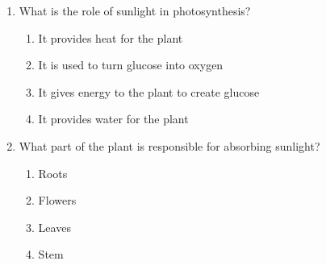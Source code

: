 \documentclass[12pt]{article}
\begin{document}
\begin{enumerate}
    \vspace{0.5cm}

    \item What is the role of sunlight in photosynthesis?

    \begin{enumerate}[label=\Alph*.]
        \item It provides heat for the plant
        \item It is used to turn glucose into oxygen
        \item It gives energy to the plant to create glucose
        \item It provides water for the plant
    \end{enumerate}
    
    \vspace{0.5cm}

    \item What part of the plant is responsible for absorbing sunlight?

    \begin{enumerate}[label=\Alph*.]
        \item Roots
        \item Flowers
        \item Leaves
        \item Stem
    \end{enumerate}

\end{enumerate}
\end{document}
